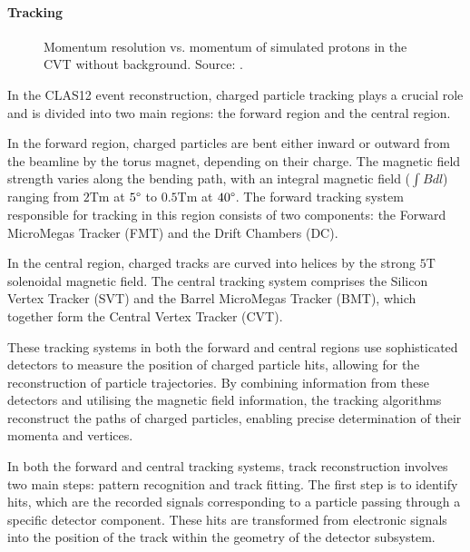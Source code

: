 \paragraph{Tracking}
    \begin{wrapfigure}{r}{0.50\textwidth}
        \centering{}
        \caption[CVT momentum resolution vs. momentum.]{Momentum resolution vs. momentum of simulated protons in the CVT without background.
        Source: \cite{ziegler2020}.}
        \label{fig::cvt_pres}
    \end{wrapfigure}

    In the CLAS12 event reconstruction, charged particle tracking plays a crucial role and is divided into two main regions: the forward region and the central region.

    In the forward region, charged particles are bent either inward or outward from the beamline by the torus magnet, depending on their charge.
    The magnetic field strength varies along the bending path, with an integral magnetic field ($\int Bdl$) ranging from $2 \text{Tm}$ at $5\degree$ to $0.5 \text{Tm}$ at $40\degree$.
    The forward tracking system responsible for tracking in this region consists of two components: the Forward MicroMegas Tracker (FMT) and the Drift Chambers (DC).

    In the central region, charged tracks are curved into helices by the strong $5 \text{T}$ solenoidal magnetic field.
    The central tracking system comprises the Silicon Vertex Tracker (SVT) and the Barrel MicroMegas Tracker (BMT), which together form the Central Vertex Tracker (CVT).

    These tracking systems in both the forward and central regions use sophisticated detectors to measure the position of charged particle hits, allowing for the reconstruction of particle trajectories.
    By combining information from these detectors and utilising the magnetic field information, the tracking algorithms reconstruct the paths of charged particles, enabling precise determination of their momenta and vertices.

    In both the forward and central tracking systems, track reconstruction involves two main steps: pattern recognition and track fitting.
    The first step is to identify hits, which are the recorded signals corresponding to a particle passing through a specific detector component.
    These hits are transformed from electronic signals into the position of the track within the geometry of the detector subsystem.

